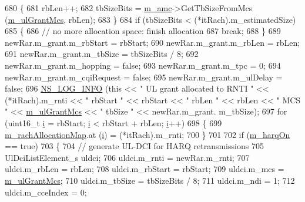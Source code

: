 \begin{DoxyCode}
680         \{
681           rbLen++;
682           tbSizeBits = \hyperlink{classns3_1_1TtaFfMacScheduler_a9c8e60d48cae88a03fb5621285733186}{m\_amc}->GetTbSizeFromMcs (\hyperlink{classns3_1_1TtaFfMacScheduler_af999ba34a23583421c6a34df08608e47}{m\_ulGrantMcs}, rbLen);
683         \}
684       \textcolor{keywordflow}{if} (tbSizeBits < (*itRach).m\_estimatedSize)
685         \{
686           \textcolor{comment}{// no more allocation space: finish allocation}
687           \textcolor{keywordflow}{break};
688         \}
689       newRar.m\_grant.m\_rbStart = rbStart;
690       newRar.m\_grant.m\_rbLen = rbLen;
691       newRar.m\_grant.m\_tbSize = tbSizeBits / 8;
692       newRar.m\_grant.m\_hopping = \textcolor{keyword}{false};
693       newRar.m\_grant.m\_tpc = 0;
694       newRar.m\_grant.m\_cqiRequest = \textcolor{keyword}{false};
695       newRar.m\_grant.m\_ulDelay = \textcolor{keyword}{false};
696       \hyperlink{group__logging_gafbd73ee2cf9f26b319f49086d8e860fb}{NS\_LOG\_INFO} (\textcolor{keyword}{this} << \textcolor{stringliteral}{" UL grant allocated to RNTI "} << (*itRach).m\_rnti << \textcolor{stringliteral}{" rbStart "} << 
      rbStart << \textcolor{stringliteral}{" rbLen "} << rbLen << \textcolor{stringliteral}{" MCS "} << \hyperlink{classns3_1_1TtaFfMacScheduler_af999ba34a23583421c6a34df08608e47}{m\_ulGrantMcs} << \textcolor{stringliteral}{" tbSize "} << newRar.m\_grant.
      m\_tbSize);
697       \textcolor{keywordflow}{for} (uint16\_t \hyperlink{bernuolliDistribution_8m_a6f6ccfcf58b31cb6412107d9d5281426}{i} = rbStart; \hyperlink{bernuolliDistribution_8m_a6f6ccfcf58b31cb6412107d9d5281426}{i} < rbStart + rbLen; \hyperlink{bernuolliDistribution_8m_a6f6ccfcf58b31cb6412107d9d5281426}{i}++)
698         \{
699           \hyperlink{classns3_1_1TtaFfMacScheduler_a5cef51239a7f724ce375f0ddf883e73c}{m\_rachAllocationMap}.at (\hyperlink{bernuolliDistribution_8m_a6f6ccfcf58b31cb6412107d9d5281426}{i}) = (*itRach).m\_rnti;
700         \}
701 
702       \textcolor{keywordflow}{if} (\hyperlink{classns3_1_1TtaFfMacScheduler_a08875f91819cf2e7cf2ed3781d36cda1}{m\_harqOn} == \textcolor{keyword}{true})
703         \{
704           \textcolor{comment}{// generate UL-DCI for HARQ retransmissions}
705           UlDciListElement\_s uldci;
706           uldci.m\_rnti = newRar.m\_rnti;
707           uldci.m\_rbLen = rbLen;
708           uldci.m\_rbStart = rbStart;
709           uldci.m\_mcs = \hyperlink{classns3_1_1TtaFfMacScheduler_af999ba34a23583421c6a34df08608e47}{m\_ulGrantMcs};
710           uldci.m\_tbSize = tbSizeBits / 8;
711           uldci.m\_ndi = 1;
712           uldci.m\_cceIndex = 0;

\end{DoxyCode}
